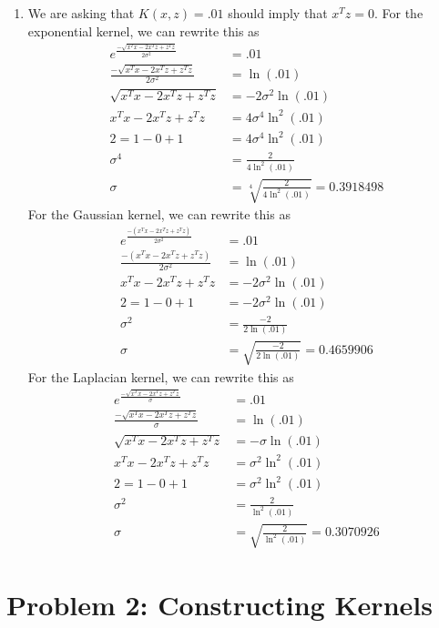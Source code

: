 \documentclass[11pt]{article}
\begin{document}
\begin{enumerate}
    \item We are asking that $K(x,z) = .01$ should imply that $x^Tz = 0$. For the exponential kernel, we can rewrite this as \begin{align*}
        e^{\frac{-\sqrt{x^Tx - 2x^Tz + z^Tz}}{2\sigma^2}} &= .01 \\
        \frac{-\sqrt{x^Tx - 2x^Tz + z^Tz}}{2\sigma^2} &= \ln(.01) \\
        \sqrt{x^Tx - 2x^Tz + z^Tz} &= -2\sigma^2\ln(.01) \\
        x^Tx - 2x^Tz + z^Tz &= 4\sigma^4\ln^2(.01) \\
        2 = 1 - 0 + 1 &= 4\sigma^4\ln^2(.01) \\
        \sigma^4 &= \frac{2}{4\ln^2(.01)} \\
        \sigma &= \sqrt[4]{\frac{2}{{4\ln^2(.01)}}}= 0.3918498
    \end{align*}
    For the Gaussian kernel, we can rewrite this as \begin{align*}
        e^{\frac{-(x^Tx - 2x^Tz + z^Tz)}{2\sigma^2}} &= .01 \\
        \frac{-(x^Tx - 2x^Tz + z^Tz)}{2\sigma^2} &= \ln(.01) \\
        x^Tx - 2x^Tz + z^Tz &= -2\sigma^2\ln(.01) \\
        2 = 1 - 0 + 1 &= -2\sigma^2\ln(.01) \\
        \sigma^2 &= \frac{-2}{2\ln(.01)} \\
        \sigma &= \sqrt{\frac{-2}{2\ln(.01)}} = 0.4659906
    \end{align*}
    For the Laplacian kernel, we can rewrite this as \begin{align*}
        e^{\frac{-\sqrt{x^Tx - 2x^Tz + z^Tz}}{\sigma}} &= .01 \\
        \frac{-\sqrt{x^Tx - 2x^Tz + z^Tz}}{\sigma} &= \ln(.01) \\
        \sqrt{x^Tx - 2x^Tz + z^Tz} &= -\sigma\ln(.01) \\
        x^Tx - 2x^Tz + z^Tz &= \sigma^2\ln^2(.01) \\
        2 = 1 - 0 + 1 &= \sigma^2\ln^2(.01) \\
        \sigma^2 &= \frac{2}{\ln^2(.01)} \\
        \sigma &= \sqrt{\frac{2}{\ln^2(.01)}} = 0.3070926
    \end{align*}
\end{enumerate}
\pagebreak

\section*{Problem 2: Constructing Kernels}
\end{document}
